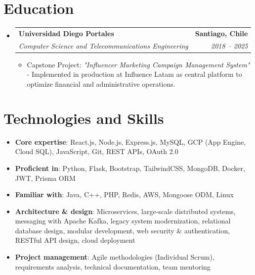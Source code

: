 \documentclass[letterpaper,11pt]{article}
\makeatletter
\newcommand{\resumeItem}[1]{
  \item\small{
    {#1 \vspace{-2pt}}
  }
}
\newcommand{\resumeSubheading}[4]{
  \vspace{-2pt}\item
    \begin{tabular*}{1.0\textwidth}[t]{l@{\extracolsep{\fill}}r}
      \textbf{#1} & \textbf{\small #2} \\
      \textit{\small#3} & \textit{\small #4} \\
    \end{tabular*}\vspace{-7pt}
}
\newcommand{\resumeSubHeadingListStart}{\begin{itemize}[leftmargin=0.0in, label={}]}
\newcommand{\resumeSubHeadingListEnd}{\end{itemize}}
\newcommand{\resumeItemListStart}{\begin{itemize}}
\newcommand{\resumeItemListEnd}{\end{itemize}\vspace{-5pt}}
\makeatother
\begin{document}
\section{Education}
\vspace{6pt}
\resumeSubHeadingListStart
\resumeSubheading
{Universidad Diego Portales}{Santiago, Chile}
{Computer Science and Telecommunications Engineering}{2018 -- 2025}
\resumeItemListStart
\resumeItem{Capstone Project: \textit{"Influencer Marketing Campaign Management System"} - Implemented in production at Influence Latam as central platform to optimize financial and administrative operations.}
\resumeItemListEnd
\resumeSubHeadingListEnd
\vspace{5pt}



\section{Technologies and Skills}
\vspace{6pt}
\resumeItemListStart
\resumeItem{\textbf{Core expertise}: React.js, Node.js, Express.js, MySQL, GCP (App Engine, Cloud SQL), JavaScript, Git, REST APIs, OAuth 2.0}
\resumeItem{\textbf{Proficient in}: Python, Flask, Bootstrap, TailwindCSS, MongoDB, Docker, JWT, Prisma ORM}
\resumeItem{\textbf{Familiar with}: Java, C++, PHP, Redis, AWS, Mongoose ODM, Linux}
\resumeItem{\textbf{Architecture \& design}: Microservices, large-scale distributed systems, messaging with Apache Kafka, legacy system modernization, relational database design, modular development, web security \& authentication, RESTful API design, cloud deployment}
\resumeItem{\textbf{Project management}: Agile methodologies (Individual Scrum), requirements analysis, technical documentation, team mentoring}
\resumeItemListEnd
\end{document}
